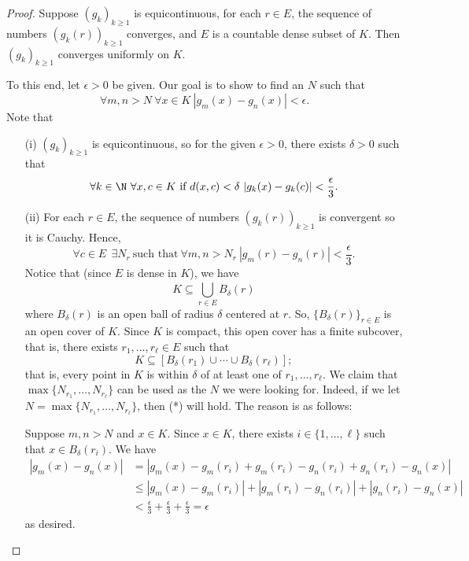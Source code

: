 \begin{proof}
    Suppose \( ({g}_{k})_{k \geq 1} \) is equicontinuous, for each \( r \in E  \), the sequence of numbers \( ({g}_{k }(r)) _{k \geq 1}\) converges, and \( E  \) is a countable dense subset of \(  K  \). Then \( ({g}_{k})_{k \geq 1} \) converges uniformly on \( K  \).  
    
    To this end, let \( \epsilon > 0 \) be given. Our goal is to show to find an \( N  \) such that 
    \[  \forall m,n > N \ \forall x \in K \ | {g}_{m}(x) - {g}_{n}(x)  | < \epsilon. \tag{*} \]
    Note that 
    \begin{enumerate}
        \item[(i)] \( ({g}_{k})_{k \geq 1} \) is equicontinuous, so for the given \( \epsilon > 0  \), there exists \( \delta > 0  \) such that 
            \[  \forall k \in \N \ \forall x,c \in K \ \text{if} \ d(x,c) < \delta \ | {g}_{k}(x) - {g}_{k }(c)  | < \frac{ \epsilon }{ 3 }. \]
        \item[(ii)] For each \( r \in E  \), the sequence of numbers \( ({g}_{k } (r))_{k \geq 1} \) is convergent so it is Cauchy. Hence, 
            \[  \forall c \in E  \ \ \exists {N}_{r} \ \text{such that} \ \forall m,n > {N}_{r} \ | {g}_{m}(r) - {g}_{n}(r) | < \frac{ \epsilon }{ 3 }. \]
            Notice that (since \( E  \) is dense in \(  K \)), we have
            \[  K \subseteq  \bigcup_{ r \in E  }^{  }  {B}_{\delta}(r) \]
            where \( {B}_{\delta}(r) \) is an open ball of radius \( \delta  \) centered at \( r  \). So, \( \{ {B}_{\delta}(r) \}_{r \in E } \) is an open cover of \( K  \). Since \( K  \) is compact, this open cover has a finite subcover, that is, there exists \( {r}_{1}, \dots, {r}_{\ell} \in E  \) such that  
            \[  K \subseteq  [{B}_{\delta}({r}_{1}) \cup \cdots \cup {B}_{\delta}({r}_{\ell})]; \]
            that is, every point in \( K  \) is within \( \delta  \) of at least one of \( {r}_{1}, \dots, {r}_{\ell} \). We claim that \( \max \{ {N}_{{r}_{1}} , \dots, {N}_{{r}_{\ell}} \}  \) can be used as the \( N  \) we were looking for. Indeed, if we let \( N = \max \{  {N}_{{r}_{1}}, \dots, {N}_{{r}_{\ell}} \}  \), then (*) will hold. The reason is as follows:

            Suppose \( m,n > N  \) and \( x \in K  \). Since \( x \in K  \), there exists \( i \in \{ 1, \dots, \ell  \}  \) such that \( x \in {B}_{\delta}({r}_{i}) \). We have 
        \begin{align*}
            | {g}_{m}(x) - {g}_{n}(x) | &= | {g}_{m}(x) - {g}_{m}({r}_{i}) + {g}_{m}({r}_{i}) - {g}_{n}({r}_{i}) + {g}_{n}({r}_{i}) - {g}_{n}(x) |   \\
                                        &\leq | {g}_{m}(x) - {g}_{m}({r}_{i}) |  + | {g}_{m}({r}_{i}) - {g}_{n}({r}_{i}) |  + | {g}_{n}({r}_{i}) - {g}_{n}(x) | \\ 
                                        &< \frac{ \epsilon }{ 3 }  + \frac{ \epsilon }{ 3 }  + \frac{ \epsilon }{ 3 } = \epsilon
        \end{align*}
        as desired.
    \end{enumerate}
\end{proof}

